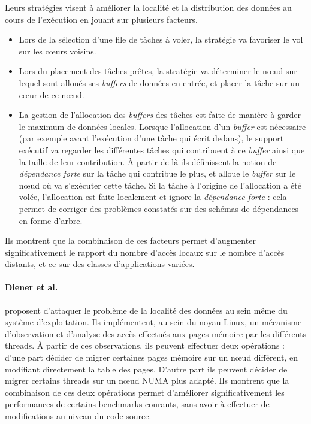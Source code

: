 Leurs stratégies visent à améliorer la localité et la distribution des données au cours de l'exécution en jouant sur plusieurs facteurs.
\begin{itemize}
  \item Lors de la sélection d'une file de tâches à voler, la stratégie va favoriser le vol sur les cœurs voisins.
  \item Lors du placement des tâches prêtes, la stratégie va déterminer le nœud sur lequel sont alloués ses \emph{buffers} de données en entrée, et placer la tâche sur un cœur de ce nœud.
  \item La gestion de l'allocation des \emph{buffers} des tâches est faite de manière à garder le maximum de données locales.
Lorsque l'allocation d'un \emph{buffer} est nécessaire (par exemple avant l'exécution d'une tâche qui écrit dedans), le support exécutif va regarder les différentes tâches qui contribuent à ce \emph{buffer} ainsi que la taille de leur contribution. À partir de là ils définissent la notion de \emph{dépendance forte} sur la tâche qui contribue le plus, et alloue le \emph{buffer} sur le nœud où va s'exécuter cette tâche.
Si la tâche à l'origine de l'allocation a été volée, l'allocation est faite localement et ignore la \emph{dépendance forte} : cela permet de corriger des problèmes constatés sur des schémas de dépendances en forme d'arbre.
\end{itemize}

Ils montrent que la combinaison de ces facteurs permet d'augmenter significativement le rapport du nombre d'accès locaux sur le nombre d'accès distants, et ce sur des classes d'applications variées.




\paragraph{Diener et al.~\cite{Diener2014}} proposent d'attaquer le problème de la localité des données au sein même du système d'exploitation.
Ils implémentent, au sein du noyau Linux, un mécanisme d'observation et d'analyse des accès effectués aux pages mémoire par les différents threads.
À partir de ces observations, ils peuvent effectuer deux opérations : d'une part décider de migrer certaines pages mémoire sur un nœud différent, en modifiant directement la table des pages.
D'autre part ils peuvent décider de migrer certains threads sur un nœud NUMA plus adapté.
Ils montrent que la combinaison de ces deux opérations permet d'améliorer significativement les performances de certains benchmarks courants, sans avoir à effectuer de modifications au niveau du code source.

